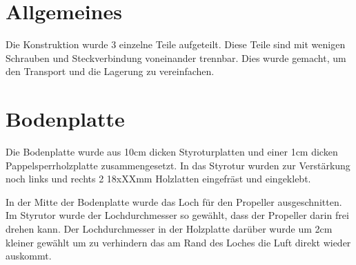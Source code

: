 \section{Allgemeines}
Die Konstruktion wurde 3 einzelne Teile aufgeteilt. Diese Teile sind mit wenigen Schrauben und Steckverbindung voneinander trennbar. Dies wurde gemacht, um den Transport und die Lagerung zu vereinfachen.

\newpage
\section{Bodenplatte}
Die Bodenplatte wurde aus 10cm dicken Styroturplatten und einer 1cm dicken Pappelsperrholzplatte zusammengesetzt. In das Styrotur wurden zur Verstärkung noch links und rechts 2 18xXXmm Holzlatten eingefräst und eingeklebt. 

In der Mitte der Bodenplatte wurde das Loch für den Propeller ausgeschnitten. Im Styrutor wurde der Lochdurchmesser so gewählt, dass der Propeller darin frei drehen kann. Der Lochdurchmesser in der Holzplatte darüber wurde um 2cm kleiner gewählt um zu verhindern das am Rand des Loches die Luft direkt wieder auskommt.

